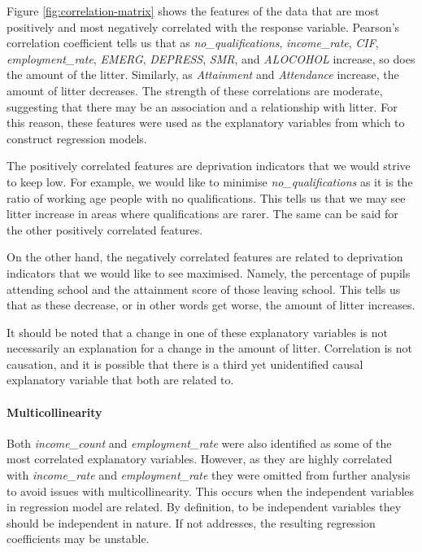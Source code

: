 \documentclass{thesis}
\begin{document}
Figure \ref{fig:correlation-matrix} shows the features of the data that are most positively and most negatively correlated with the response variable. Pearson's correlation coefficient tells us that as \textit{no\_qualifications}, \textit{income\_rate}, \textit{CIF}, \textit{employment\_rate}, \textit{EMERG}, \textit{DEPRESS}, \textit{SMR}, and \textit{ALOCOHOL} increase, so does the amount of the litter. Similarly, as \textit{Attainment} and \textit{Attendance} increase, the amount of litter decreases. The strength of these correlations are moderate, suggesting that there may be an association and a relationship with litter. For this reason, these features were used as the explanatory variables from which to construct regression models.

The positively correlated features are deprivation indicators that we would strive to keep low. For example, we would like to minimise \textit{no\_qualifications} as it is the ratio of working age people with no qualifications. This tells us that we may see litter increase in areas where qualifications are rarer. The same can be said for the other positively correlated features.

On the other hand, the negatively correlated features are related to deprivation indicators that we would like to see maximised. Namely, the percentage of pupils attending school and the attainment score of those leaving school. This tells us that as these decrease, or in other words get worse, the amount of litter increases.

It should be noted that a change in one of these explanatory variables is not necessarily an explanation for a change in the amount of litter. Correlation is not causation, and it is possible that there is a third yet unidentified causal explanatory variable that both are related to.

\paragraph{Multicollinearity}

Both \textit{income\_count} and \textit{employment\_rate} were also identified as some of the most correlated explanatory variables. However, as they are highly correlated with \textit{income\_rate} and \textit{employment\_rate} they were omitted from further analysis to avoid issues with multicollinearity. This occurs when the independent variables in regression model are related. By definition, to be independent variables they should be independent in nature. If not addresses, the resulting regression coefficients may be unstable.
\end{document}
